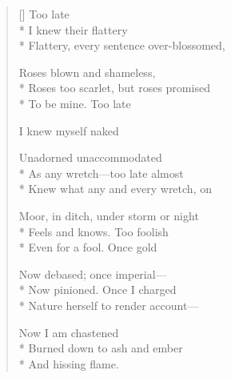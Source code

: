 \label{ch:lear_az}
\settowidth{\versewidth}{Flattery, every sentence over-blossomed,}
\begin{verse}[\versewidth]
\hspace*{3\vgap} Too late\\*
I knew their flattery\\*
Flattery, every sentence over-blossomed,

Roses blown and shameless,\\*
Roses too scarlet, but roses promised\\*
To be mine.     Too late

I knew myself naked

Unadorned    unaccommodated\\*
As any wretch---too late almost\\*
Knew what any and every wretch, on

Moor, in ditch, under storm or night\\*
Feels and knows.   Too foolish\\*
Even for a fool.   Once gold

Now debased; once imperial---\\*
Now pinioned.   Once I charged\\*
Nature herself to render account---

Now I am chastened\\*
Burned down to ash and ember\\*
And hissing flame.
\end{verse}
